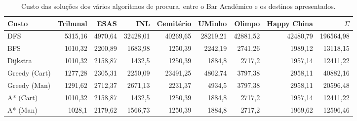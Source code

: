 \documentclass[12pt, a4paper]{article}
\begin{document}
\begin{table}[H]
    \small

    \begin{adjustwidth}{-1.5cm}{-1.5cm}
        \begin{center}
            \begin{tabular}{|l|r|r|r|r|r|r|r|r|}
                \hline
                    Custo       &
                    Tribunal    &
                    ESAS        &
                    INL         &
                    Cemitério   &
                    UMinho      &
                    Olimpo      &
                    Happy China &
                    $\Sigma$    \\

                \hline
                DFS & 5315,16 & 4970,64 & 32428,01 & 40269,65 & 28219,21 & 42881,52 & 42480,79 & 196564,98 \\
                \hline
                BFS & 1010,32 & 2200,89 & 1683,98 & 1250,39 & 2242,19 & 2741,26 & 1989,12 & 13118,15 \\
                \hline
                Dijkstra & 1010,32 & 2158,87 & 1432,5 & 1250,39 & 1884,8 & 2717,2 & 1957,14 & 12411,22 \\
                \hline
                Greedy (Cart) & 1277,28 & 2305,31 & 2250,09 & 23491,25 & 4802,74 & 3797,38 & 2958,11 & 40882,16 \\
                \hline
                Greedy (Man) & 1291,62 & 2712,37 & 2671,13 & 2231,37 & 4934,5 & 3797,38 & 2958,11 & 20596,48 \\
                \hline
                A* (Cart) & 1010,32 & 2158,87 & 1432,5 & 1250,39 & 1884,8 & 2717,2 & 1957,14 & 12411,22 \\
                \hline
                A* (Man) & 1028,1 & 2179,62 & 1566,73 & 1250,39 & 1884,8 & 2717,2 & 1969,62 & 12596,46 \\
                \hline
            \end{tabular}
        \end{center}
    \end{adjustwidth}

    \caption{
        Custo das soluções dos vários algoritmos de procura, entre o Bar Académico e os destinos
        apresentados.
    }
\end{table}
\end{document}

